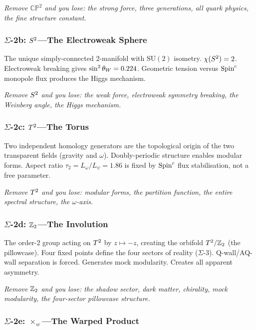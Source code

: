 \emph{Remove $\mathbb{CP}^2$ and you lose: the strong force, three generations, all quark physics, the fine structure constant.}

\subsubsection*{$\Sigma$-2b: $S^2$---The Electroweak Sphere}

The unique simply-connected 2-manifold with $\mathrm{SU}(2)$ isometry.  $\chi(S^2) = 2$.  Electroweak breaking gives $\sin^2\theta_W = 0.224$.  Geometric tension versus $\text{Spin}^c$ monopole flux produces the Higgs mechanism.

\emph{Remove $S^2$ and you lose: the weak force, electroweak symmetry breaking, the Weinberg angle, the Higgs mechanism.}

\subsubsection*{$\Sigma$-2c: $T^2$---The Torus}

Two independent homology generators are the topological origin of the two transparent fields (gravity and $\omega$).  Doubly-periodic structure enables modular forms.  Aspect ratio $\tau_2 = L_\omega/L_\psi = 1.86$ is fixed by $\text{Spin}^c$ flux stabilisation, not a free parameter.

\emph{Remove $T^2$ and you lose: modular forms, the partition function, the entire spectral structure, the $\omega$-axis.}

\subsubsection*{$\Sigma$-2d: $\mathbb{Z}_2$---The Involution}

The order-2 group acting on $T^2$ by $z \mapsto -z$, creating the orbifold $T^2/\mathbb{Z}_2$ (the pillowcase).  Four fixed points define the four sectors of reality ($\Sigma$-3).  Q-wall/AQ-wall separation is forced.  Generates mock modularity.  Creates all apparent asymmetry.

\emph{Remove $\mathbb{Z}_2$ and you lose: the shadow sector, dark matter, chirality, mock modularity, the four-sector pillowcase structure.}

\subsubsection*{$\Sigma$-2e: $\times_w$---The Warped Product}

